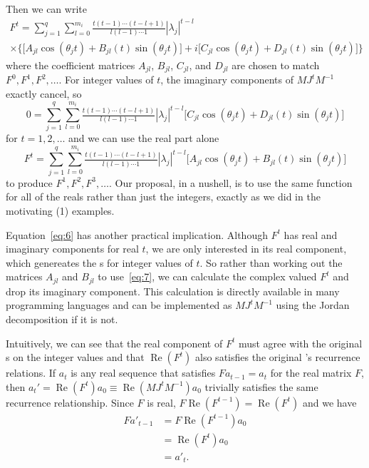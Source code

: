 \documentclass[12pt,fleqn]{article}
\renewcommand{\Re}{\operatorname{Re}}
\newcommand{\AR}{\allcaps{AR}}
\begin{document}
Then we can write
\begin{multline}\label{eq:6}
  F^t =
  \sum_{j = 1}^q \sum_{l=0}^{m_i} \tfrac{t(t-1)\cdots(t-l+1)}{l (l - 1) \cdots 1} |\lambda_j|^{t-l} \\
  \times\Big\{\big[A_{jl} \cos(\theta_j t) + B_{jl}(t) \sin(\theta_j t)\big] + i\big[C_{jl} \cos(\theta_j t) + D_{jl}(t) \sin(\theta_j t)\big]\Big\}
\end{multline}
where the coefficient matrices $A_{jl}$, $B_{jl}$, $C_{jl}$, and
$D_{jl}$ are chosen to match $F^0, F^1, F^2,\dots$. 
For integer values of $t$, the imaginary components of $M J^t M^{-1}$
exactly cancel, so
\begin{equation*}
  0 = \sum_{j = 1}^q \sum_{l=0}^{m_i} \tfrac{t(t-1)\cdots(t-l+1)}{l (l - 1) \cdots 1} |\lambda_j|^{t-l}
  \big[C_{jl} \cos(\theta_j t) + D_{jl}(t) \sin(\theta_j t)\big]
\end{equation*}
for $t = 1,2, \dots$ and we can use the real part alone
\begin{equation}\label{eq:7}
  F^t =
  \sum_{j = 1}^q \sum_{l=0}^{m_i} \tfrac{t(t-1)\cdots(t-l+1)}{l (l - 1) \cdots 1} |\lambda_j|^{t-l} \big[A_{jl} \cos(\theta_j t) + B_{jl}(t) \sin(\theta_j t)\big]
\end{equation}
to produce $F^1, F^2, F^3,\dots$. Our proposal, in a nushell, is to
use the same function for all of the reals rather than just the
integers, exactly as we did in the motivating \AR(1) examples.

Equation~\eqref{eq:6} has another practical implication. Although
$F^t$ has real and imaginary components for real $t$, we are only
interested in its real component, which genereates the \IRF s for
integer values of $t$. So rather than working out the matrices
$A_{jl}$ and $B_{jl}$ to use~\eqref{eq:7}, we can calculate the
complex valued $F^t$ and drop its imaginary component. This
calculation is directly available in many programming languages and
can be implemented as $M J^t M^{-1}$ using the Jordan decomposition if
it is not.

Intuitively, we can see that the real component of $F^t$ must agree
with the original \IRF s on the integer values and that $\Re(F^t)$
also satisfies the original \VAR's recurrence relations. If $a_t$ is
any real sequence that satisfies $F a_{t-1} = a_t$ for the real matrix
$F$, then $a_t' = \Re(F^t) a_{0} \equiv \Re(M J^t M^{-1}) a_0$
trivially satisfies the same recurrence relationship. Since $F$ is
real, $F \Re(F^{t-1}) = \Re(F^t)$ and we have
\begin{align*}
F a'_{t-1} &= F \Re(F^{t-1}) a_{0} \\
&= \Re(F^t) a_0 \\
&= a'_t.
\end{align*}
\end{document}

